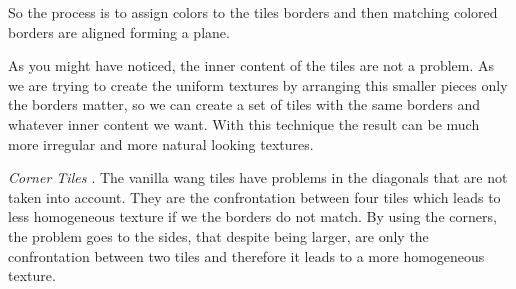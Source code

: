 So the process is to assign colors to the tiles borders and then matching colored borders are aligned forming a plane.


As you might have noticed, the inner content of the tiles are not a problem. As we are trying to create the uniform textures by arranging this smaller pieces only the borders matter, so we can create a set of tiles with the same borders and whatever inner content we want. With this technique the result can be much more irregular and more natural looking textures.


\emph{Corner Tiles \cite{LD06AWTCECC}}. The vanilla wang tiles have problems in the diagonals that are not taken into account. They are the confrontation between four tiles which leads to less homogeneous texture if we the borders do not match. By using the corners, the problem goes to the sides, that despite being larger, are only the confrontation between two tiles and therefore it leads to a more homogeneous texture.






